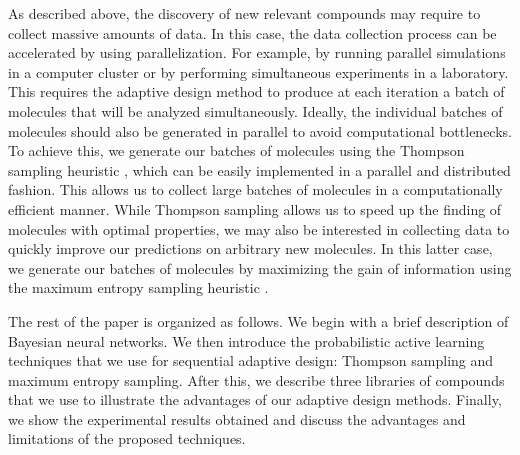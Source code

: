 As described above, the discovery of new relevant compounds may require to collect massive amounts of data.
In this case, the data collection process can be accelerated by using parallelization.
For example, by running parallel simulations in a computer cluster or by performing simultaneous experiments in a laboratory.
This requires the adaptive design method to produce at each iteration a batch of molecules that will be
analyzed simultaneously. Ideally, the individual batches of molecules should also be generated in parallel to avoid computational bottlenecks. To achieve this, we generate our batches of molecules using the Thompson sampling heuristic \cite{Thompson_1933},
which can be easily implemented in a parallel and distributed fashion. This allows us to collect large
batches of molecules in a computationally efficient manner. While Thompson sampling allows us to speed up
the finding of molecules with optimal properties, we may also be interested in collecting data to quickly
improve our predictions on arbitrary new molecules. In this latter case, we generate our batches
of molecules by maximizing the gain of information using the maximum entropy sampling heuristic \cite{MacKay_1992}.

The rest of the paper is organized as follows. We begin with a brief description of Bayesian neural networks. We then introduce the probabilistic active learning techniques that we use for sequential adaptive design: Thompson sampling and maximum entropy sampling. After this, we describe three libraries of compounds that we use to illustrate the advantages of our adaptive design methods. Finally, we show the experimental results obtained and discuss the advantages and limitations of the proposed techniques.
